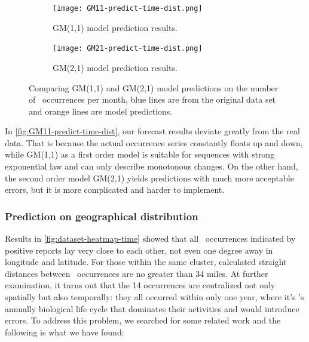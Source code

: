 \documentclass{mcmthesis}
\begin{document}
\begin{figure}[htbp]
    \centering
    \begin{subfigure}{0.4\textwidth}
        \centering
        \texttt{[image: GM11-predict-time-dist.png]}
        \caption{GM(1,1) model prediction results.}
        \label{fig:GM11-predict-time-dist}
    \end{subfigure}
    \quad
    \begin{subfigure}{0.44\textwidth}
        \centering
        \texttt{[image: GM21-predict-time-dist.png]}
        \caption{GM(2,1) model prediction results.}
    \label{fig:GM21-predict-time-dist}
    \end{subfigure}
    \caption{Comparing GM(1,1) and GM(2,1) model predictions on the number of \VM\ occurrences per month, blue lines are from the original data set and orange lines are model predictions.}
    \label{fig:predict-time-dist}
\end{figure}

In \autoref{fig:GM11-predict-time-dist}, our forecast results deviate greatly from the real data. That is because the actual occurrence series constantly floats up and down, while GM(1,1) as a first order model is suitable for sequences with strong exponential law and can only describe monotonous changes\cite{julong1989intro}. On the other hand, the second order model GM(2,1) yields predictions with much more acceptable errors, but it is more complicated and harder to implement.


\subsubsection{Prediction on geographical distribution}
Results in \autoref{fig:dataset-heatmap-time} showed that all \VM\ occurrences indicated by positive reports lay very close to each other, not even one degree away in longitude and latitude. For those within the same cluster, calculated straight distances between \VM\ occurrences are no greater than 34 miles. At further examination, it turns out that the 14 occurrences are centralized not only spatially but also temporally: they all occurred within only one year, where it's \VM's annually biological life cycle\cite{matsuura1973bionomic} that dominates their activities and would introduce errors. To address this problem, we searched for some related work and the following is what we have found:
\end{document}

